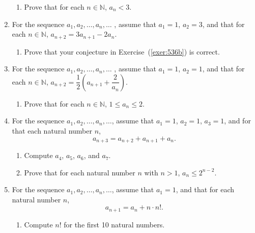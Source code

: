 \begin{enumerate}
\begin{enumerate}
  \item Prove that for each  $n \in \mathbb{N}$,  $a_n  < 3$.
\end{enumerate}

\item For the sequence   $a_1 ,a_2 , \ldots ,a_n , \ldots $ , assume that  $a_1  = 1$,  $a_2  = 3$, and that for each  $n \in \mathbb{N}$,  $a_{n + 2}  = 3a_{n + 1}  - 2a_n $. \label{exer:sec53-6}

\begin{enumerate}
  \yitem Calculate  $a_3 $  through  $a_6 $.

  \yitem Make a conjecture for a formula for  $a_n $ for each  $n \in \mathbb{N}$. \label{exer:536b}

  \item Prove that your conjecture in Exercise~(\ref{exer:536b}) is correct.
\end{enumerate}

\item For the sequence   $a_1 ,a_2 , \ldots ,a_n , \ldots $ , assume that  $a_1  = 1$,  $a_2  = 1$, and that for each  $n \in \mathbb{N}$,  $a_{n + 2}  = \dfrac{1}{2}\left( {a_{n + 1}  + \dfrac{2}{{a_n }}} \right)$. \label{exer:sec53-7}

\begin{enumerate}
  \yitem Calculate  $a_3 $ through  $a_6 $.

  \item Prove that for each  $n \in \mathbb{N}$,  $1 \leq a_n  \leq 2$.
\end{enumerate}

\item For the sequence   $a_1 ,a_2 , \ldots ,a_n , \ldots $, assume that $a_1=1$, $a_2=1$, $a_3=1$, and for that each natural number $n$, 
\label{exer:sec53-8}%
\[
a_{n+3} = a_{n+2} + a_{n+1} + a_n.
\]
\begin{enumerate}
\item Compute $a_4$, $a_5$, $a_6$, and $a_7$.

\item Prove that for each natural number $n$ with $n>1$, $a_n \leq 2^{n-2}$.
\end{enumerate}

\item For the sequence $a_1, a_2, \ldots, a_n, \ldots$, assume that $a_1 = 1$, and that for each natural number $n$,
\[
a_{n + 1} = a_n + n \cdot n!.
\]
\begin{enumerate}\label{exer:sec53-9}
\item Compute $n!$ for the first 10 natural numbers.


\end{enumerate}
\end{enumerate}
